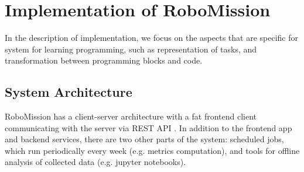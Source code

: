\chapter{Implementation of RoboMission}
\label{chap:implementation-of-robomission}

In the description of implementation, we focus on the aspects that are
specific for system for learning programming, such as representation of tasks,
and transformation between programming blocks and code.

\section{System Architecture}

RoboMission has a client-server architecture
with a fat frontend client communicating with the server via REST API
\cite{rest-api}.
In addition to the frontend app and backend services,
there are two other parts of the system:
scheduled jobs, which run periodically every week (e.g. metrics computation),
and tools for offline analysis of collected data
(e.g. jupyter notebooks). %

